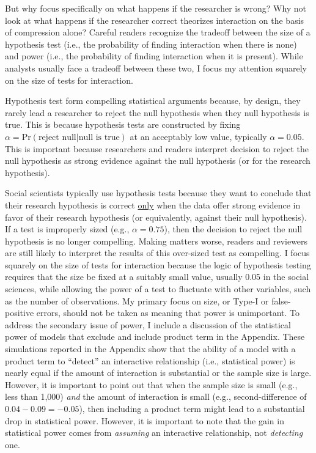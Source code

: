 \documentclass[12pt]{article}
\begin{document}
But why focus specifically on what happens if the researcher is wrong? Why not look at what happens if the researcher correct theorizes interaction on the basis of compression alone? Careful readers recognize the tradeoff between the size of a hypothesis test (i.e., the probability of finding interaction when there is none) and power (i.e., the probability of finding interaction when it is present). While analysts usually face a tradeoff between these two, I focus my attention squarely on the size of tests for interaction.

Hypothesis test form compelling statistical arguments because, by design, they rarely lead a researcher to reject the null hypothesis when they null hypothesis is true. This is because hypothesis tests are constructed by fixing $\alpha = \text{Pr}(\text{reject null} | \text{null is true})$  at an acceptably low value, typically $\alpha = 0.05$. This is important because researchers and readers interpret decision to reject the null hypothesis as strong evidence against the null hypothesis (or for the research hypothesis).

Social scientists typically use hypothesis tests because they want to conclude that their research hypothesis is correct \underline{only} when the data offer strong evidence in favor of their research hypothesis (or equivalently, against their null hypothesis). If a test is improperly sized (e.g., $\alpha = 0.75$), then the decision to reject the null hypothesis is no longer compelling. Making matters worse, readers and reviewers are still likely to interpret the results of this over-sized test as compelling. I focus squarely on the size of tests for interaction because the logic of hypothesis testing requires that the size be fixed at a suitably small value, usually 0.05 in the social sciences, while allowing the power of a test to fluctuate with other variables, such as the number of observations. My primary focus on size, or Type-I or false-positive errors, should not be taken as meaning that power is unimportant. To address the secondary issue of power, I include a discussion of the statistical power of models that exclude and include product term in the Appendix. These simulations reported in the Appendix show that the ability of a model with a product term to ``detect'' an interactive relationship (i.e., statistical power) is nearly equal if the amount of interaction is substantial or the sample size is large. However, it is important to point out that when the sample size is small (e.g., less than 1,000) \textit{and} the amount of interaction is small (e.g., second-difference of $0.04 - 0.09 = -0.05$), then including a product term might lead to a substantial drop in statistical power. However, it is important to note that the gain in statistical power comes from \textit{assuming} an interactive relationship, not \textit{detecting} one.
\end{document}
